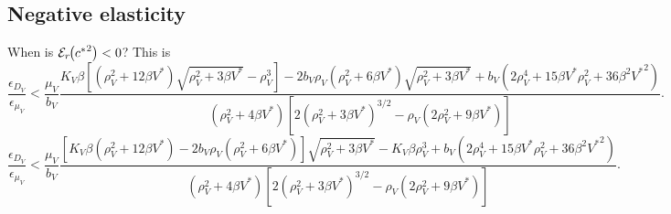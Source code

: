 \documentclass{article}
\newcommand{\md}{\mathrm{d}}
\newcommand{\elasticity}[2]{\mathcal{E}_{#2}\negthickspace\left({#1}\right)}
\begin{document}
\subsection{Negative elasticity}

When is $\elasticity{{c^*}^2}{r} < 0$?  This is
\begin{equation}
  \frac{\epsilon_{D_V}}{\epsilon_{\mu_V}}
  <
  \frac{\mu_V}{b_V}
  \frac{
    K_V 
    \beta
    \left[\left(\rho_V^2 + 12 \beta V^*\right)
      \sqrt{\rho_V^2 + 3 \beta V^*} - \rho_V^3\right]
    -
    2 b_V \rho_V \left(\rho_V^2 + 6 \beta V^*\right)
    \sqrt{\rho_V^2 + 3 \beta V^*}
    + b_V \left(
      2 \rho_V^4
      + 15 \beta V^* \rho_V^2
      + 36 \beta^2 {V^*}^2
    \right)}
  {\left(\rho_V^2 + 4 \beta V^*\right)
    \left[2 \left(\rho_V^2 + 3 \beta V^*\right)^{3/2}
      - \rho_V \left(2 \rho_V^2 + 9 \beta V^*\right)\right]}.
\end{equation}
\begin{equation}
  \frac{\epsilon_{D_V}}{\epsilon_{\mu_V}}
  <
  \frac{\mu_V}{b_V}
  \frac{
    \left[
      K_V
      \beta
      \left(\rho_V^2 + 12 \beta V^*\right)
      - 2 b_V \rho_V
      \left(\rho_V^2 + 6 \beta V^*\right)
    \right]
    \sqrt{\rho_V^2 + 3 \beta V^*}
    - K_V \beta \rho_V^3
    + b_V \left(
      2 \rho_V^4
      + 15 \beta V^* \rho_V^2
      + 36 \beta^2 {V^*}^2
    \right)}
  {\left(\rho_V^2 + 4 \beta V^*\right)
    \left[2 \left(\rho_V^2 + 3 \beta V^*\right)^{3/2}
      - \rho_V \left(2 \rho_V^2 + 9 \beta V^*\right)\right]}.
\end{equation}




  

\end{document}
